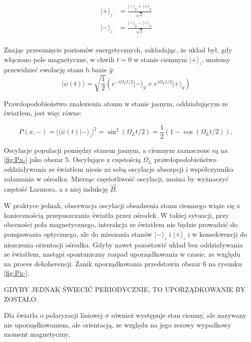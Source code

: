 \documentclass[a4paper,10pt,twoside]{report}
\begin{document}
\begin{align}
\lvert + \rangle_z &=\frac{\lvert - \rangle_y + \lvert + \rangle_y}{\sqrt{2}}\\
\lvert - \rangle_z &=\frac{\lvert - \rangle_y - \lvert + \rangle_y}{\sqrt{2}}\\
\end{align}

Znając przesunięcie poziomów energetycznych, zakładając, że układ był, gdy włączono pole magnetyczne, w chwili $t=0$ w stanie ciemnym $\lvert + \rangle_z$, możemy przewidzieć ewolucję stanu b bazie $\hat y$:
\begin{equation}
\lvert \psi(t) \rangle = \sqrt{\frac{1}{2}} \left( e^{-i \Omega_L t/2} \lvert - \rangle_y + e^{i \Omega_L t/2} \lvert + \rangle_y \right)
\end{equation} 
 
Prawdopodobieństwo znalezienia atomu w stanie jasnym, oddziałującym ze światłem, jest więc równe:

 \begin{equation}
P \left( x,- \right)= \lvert \langle \psi(t) \lvert - \rangle_z \rvert^2 = \sin^2 (\Omega_L t/2)= \frac{1}{2}\left(1-\cos(\Omega_L t/2) \right),
\label{Px-} 
\end{equation} 

Oscylacje populacji pomiędzy stanem jasnym, a ciemnym zaznaczone są na \ref{fig:Px-} jako obszar 5. Oscylujące z częstością $\Omega_L$ prawdopodobieństwo oddziaływania ze światłem niesie za sobą oscylacje absorpcji i współczynnika załamania w ośrodku. Mierząc częstotliwość oscylacji, można by wyznaczyć częstość Larmora, a z niej indukcję $\vec B$.


W praktyce jednak, obserwacja oscylacji obsadzenia stanu ciemnego wiąże się z koniecznością przepuszczania światła przez ośrodek. W takiej sytuacji, przy obecności pola magnetycznego, interakcja ze światłem nie będzie prowadzić do pompowania optycznego, ale do mieszania stanów $\lvert - \rangle_z$ i $\lvert + \rangle_z$ i w konsekwencji do niszczenia orientacji ośrodka. Gdyby nawet pozostawić układ bez oddziaływania ze światłem, nastąpi spontaniczny rozpad uporządkowania w czasie, ze względu na proces dekoherencji. Zanik uporządkowania przedstawia obszar 6 na rysunku \ref{fig:Px-}.


GDYBY JEDNAK ŚWIECIĆ PERIODYCZNIE, TO UPORZĄDKOWANIE BY ZOSTAŁO.


Dla światła o polaryzacji liniowej $\sigma$ również występuje stan ciemny, ale nazywany nie uporządkowaniem, ale orientacją, ze względu na jego zerowy wypadkowy moment magnetyczny.
\end{document}
